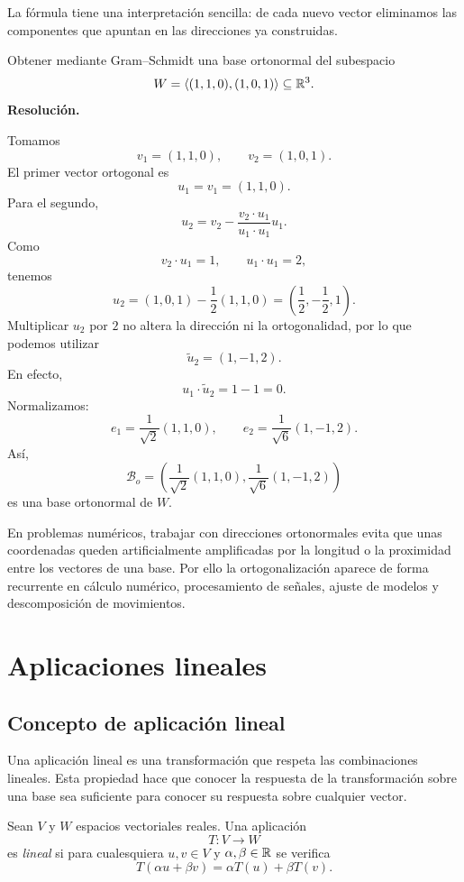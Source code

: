 La fórmula tiene una interpretación sencilla: de cada nuevo vector eliminamos las componentes que apuntan en las direcciones ya construidas.

\begin{solvedexercise}
Obtener mediante Gram--Schmidt una base ortonormal del subespacio
\[
W=\langle(1,1,0),(1,0,1)\rangle\subseteq\mathbb{R}^3.
\]
\tcblower
\textbf{Resolución.}\par\smallskip
Tomamos
\[
v_1=(1,1,0),
\qquad
v_2=(1,0,1).
\]
El primer vector ortogonal es
\[
u_1=v_1=(1,1,0).
\]
Para el segundo,
\[
u_2
=v_2-\frac{v_2\cdot u_1}{u_1\cdot u_1}u_1.
\]
Como
\[
v_2\cdot u_1=1,
\qquad
u_1\cdot u_1=2,
\]
tenemos
\[
u_2
=(1,0,1)-\frac12(1,1,0)
=\left(\frac12,-\frac12,1\right).
\]
Multiplicar $u_2$ por $2$ no altera la dirección ni la ortogonalidad, por lo que podemos utilizar
\[
\widetilde u_2=(1,-1,2).
\]
En efecto,
\[
u_1\cdot\widetilde u_2=1-1=0.
\]
Normalizamos:
\[
e_1=\frac{1}{\sqrt2}(1,1,0),
\qquad
 e_2=\frac{1}{\sqrt6}(1,-1,2).
\]
Así,
\[
\boxed{
\mathcal B_o=
\left(
\frac{1}{\sqrt2}(1,1,0),
\frac{1}{\sqrt6}(1,-1,2)
\right)
}
\]
es una base ortonormal de $W$.
\end{solvedexercise}

En problemas numéricos, trabajar con direcciones ortonormales evita que unas coordenadas queden artificialmente amplificadas por la longitud o la proximidad entre los vectores de una base. Por ello la ortogonalización aparece de forma recurrente en cálculo numérico, procesamiento de señales, ajuste de modelos y descomposición de movimientos.

\section{Aplicaciones lineales}
\label{sec:aplicaciones-lineales}

\subsection{Concepto de aplicación lineal}

Una aplicación lineal es una transformación que respeta las combinaciones lineales. Esta propiedad hace que conocer la respuesta de la transformación sobre una base sea suficiente para conocer su respuesta sobre cualquier vector.

\begin{definition}
Sean $V$ y $W$ espacios vectoriales reales. Una aplicación
\[
T:V\longrightarrow W
\]
es \emph{lineal} si para cualesquiera $u,v\in V$ y $\alpha,\beta\in\mathbb{R}$ se verifica
\[
T(\alpha u+\beta v)
=\alpha T(u)+\beta T(v).
\]
\end{definition}

